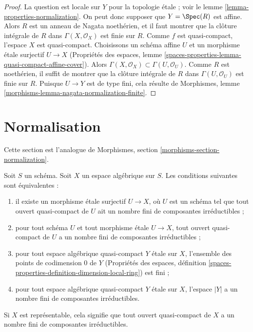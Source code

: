 \begin{proof}
La question est locale sur $Y$ pour la topologie étale ; voir
le lemme \ref{lemma-properties-normalization}.
On peut donc supposer que $Y = \Spec(R)$ est affine.
Alors $R$ est un anneau de Nagata noethérien,
et il faut montrer que la clôture intégrale de
$R$ dans $\Gamma(X, \mathcal{O}_X)$ est finie sur $R$.
Comme $f$ est quasi-compact, l'espace $X$ est quasi-compact.
Choisissons un schéma affine $U$ et un morphisme étale surjectif
$U \to X$ (Propriétés des espaces, lemme
\ref{spaces-properties-lemma-quasi-compact-affine-cover}).
Alors $\Gamma(X, \mathcal{O}_X) \subset \Gamma(U, \mathcal{O}_U)$.
Comme $R$ est noethérien, il suffit de montrer que
la clôture intégrale de $R$ dans $\Gamma(U, \mathcal{O}_U)$
est finie sur $R$. Puisque $U \to Y$ est de type fini,
cela résulte de
Morphismes, lemme \ref{morphisms-lemma-nagata-normalization-finite}.
\end{proof}







\section{Normalisation}
\label{section-normalization}

\noindent
Cette section est l'analogue de
Morphismes, section \ref{morphisms-section-normalization}.

\begin{lemma}
\label{lemma-prepare-normalization}
Soit $S$ un schéma. Soit $X$ un espace algébrique sur $S$.
Les conditions suivantes sont équivalentes :
\begin{enumerate}
\item il existe un morphisme étale surjectif $U \to X$, où $U$
est un schéma tel que tout ouvert quasi-compact de $U$ ait
un nombre fini de composantes irréductibles ;
\item pour tout schéma $U$ et tout morphisme étale
$U \to X$, tout ouvert quasi-compact de $U$ a un nombre fini de
composantes irréductibles ;
\item pour tout espace algébrique quasi-compact $Y$ étale sur $X$,
l'ensemble des points de codimension $0$ de $Y$ (Propriétés des espaces,
définition \ref{spaces-properties-definition-dimension-local-ring})
est fini ;
\item pour tout espace algébrique quasi-compact $Y$ étale sur $X$,
l'espace $|Y|$ a un nombre fini de composantes irréductibles.
\end{enumerate}
Si $X$ est représentable, cela signifie que tout ouvert quasi-compact de $X$
a un nombre fini de composantes irréductibles.
\end{lemma}

